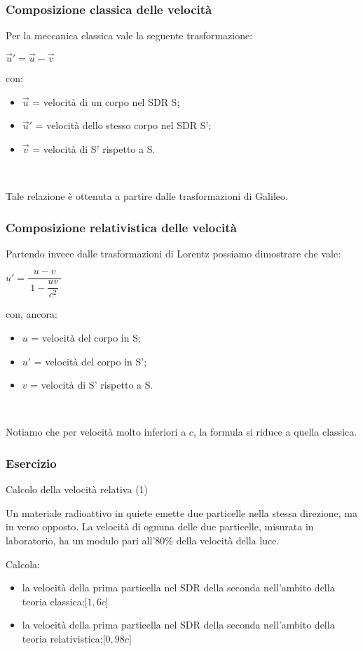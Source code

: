 \documentclass[]{beamer}
\theoremstyle{plain}
\begin{document}
\begin{frame}
\frametitle{Composizione classica delle velocità}
Per la meccanica classica vale la seguente trasformazione:
\begin{center}
$ \vec{u}' = \vec{u} - \vec{v} $
\end{center}
con:
\begin{itemize}
  \item $ \vec{u} $ = velocità di un corpo nel SDR S;
  \item $ \vec{u}' $ = velocità dello stesso corpo nel SDR S';
  \item $ \vec{v} $ = velocità di S' rispetto a S.
\end{itemize}\pause

~

Tale relazione è ottenuta a partire dalle trasformazioni di Galileo.
\end{frame}




\begin{frame}
\frametitle{Composizione relativistica delle velocità}
Partendo invece dalle trasformazioni di Lorentz possiamo dimostrare che vale:
\begin{center}
\colorbox{blue!30}{$ u' = \dfrac{u-v}{~1-\dfrac{uv}{c^2}~}  $}
\end{center}
con, ancora:
\begin{itemize}
  \item $ u $ = velocità del corpo in S;
  \item $ u' $ = velocità del corpo in S';
  \item $ v $ = velocità di S' rispetto a S.
\end{itemize}\pause

~

Notiamo che per velocità molto inferiori a $ c $, la formula si riduce a quella classica.
\end{frame}




\begin{frame}
\frametitle{Esercizio}
\begin{exampleblock}{Calcolo della velocità relativa (1)}
\small{
  Un materiale radioattivo in quiete emette due particelle nella stessa direzione, ma in verso opposto. La velocità di ognuna delle due particelle, misurata in laboratorio, ha un modulo pari all'$ 80\% $ della velocità della luce.

  Calcola:
  \begin{itemize}
    \item la velocità della prima particella nel SDR della seconda nell'ambito della teoria classica;\hspace*{\fill}[$ 1,6c $]
    \item la velocità della prima particella nel SDR della seconda nell'ambito della teoria relativistica;\hspace*{\fill}[$ 0,98c $]
  \end{itemize}
  }
\end{exampleblock}
\end{frame}
\end{document}
